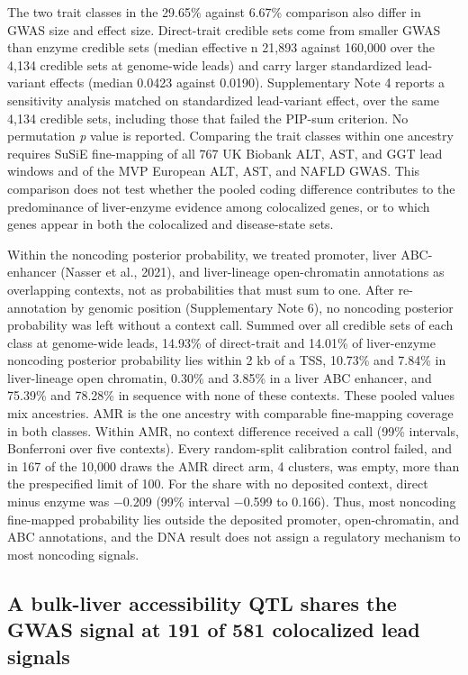 The two trait classes in the 29.65\% against 6.67\% comparison also differ in GWAS size and effect size. Direct-trait credible sets come from smaller GWAS than enzyme credible sets (median effective n 21,893 against 160,000 over the 4,134 credible sets at genome-wide leads) and carry larger standardized lead-variant effects (median 0.0423 against 0.0190). Supplementary Note 4 reports a sensitivity analysis matched on standardized lead-variant effect, over the same 4,134 credible sets, including those that failed the PIP-sum criterion. No permutation \emph{p} value is reported. Comparing the trait classes within one ancestry requires SuSiE fine-mapping of all 767 UK Biobank ALT, AST, and GGT lead windows and of the MVP European ALT, AST, and NAFLD GWAS. This comparison does not test whether the pooled coding difference contributes to the predominance of liver-enzyme evidence among colocalized genes, or to which genes appear in both the colocalized and disease-state sets.

Within the noncoding posterior probability, we treated promoter, liver ABC-enhancer (Nasser et al., 2021), and liver-lineage open-chromatin annotations as overlapping contexts, not as probabilities that must sum to one. After re-annotation by genomic position (Supplementary Note 6), no noncoding posterior probability was left without a context call. Summed over all credible sets of each class at genome-wide leads, 14.93\% of direct-trait and 14.01\% of liver-enzyme noncoding posterior probability lies within 2 kb of a TSS, 10.73\% and 7.84\% in liver-lineage open chromatin, 0.30\% and 3.85\% in a liver ABC enhancer, and 75.39\% and 78.28\% in sequence with none of these contexts. These pooled values mix ancestries. AMR is the one ancestry with comparable fine-mapping coverage in both classes. Within AMR, no context difference received a call (99\% intervals, Bonferroni over five contexts). Every random-split calibration control failed, and in 167 of the 10,000 draws the AMR direct arm, 4 clusters, was empty, more than the prespecified limit of 100. For the share with no deposited context, direct minus enzyme was −0.209 (99\% interval −0.599 to 0.166). Thus, most noncoding fine-mapped probability lies outside the deposited promoter, open-chromatin, and ABC annotations, and the DNA result does not assign a regulatory mechanism to most noncoding signals.

\subsection{A bulk-liver accessibility QTL shares the GWAS signal at 191 of 581 colocalized lead signals}\label{a-bulk-liver-accessibility-qtl-shares-the-gwas-signal-at-191-of-581-colocalized-lead-signals}

